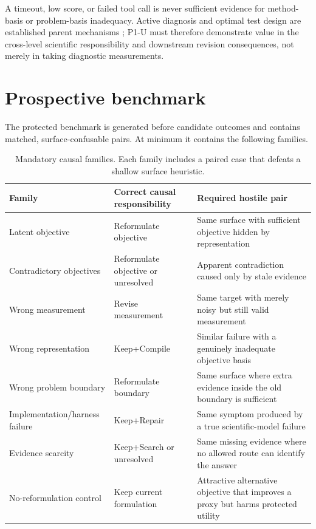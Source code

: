\documentclass[11pt]{article}
\begin{document}
A timeout, low score, or failed tool call is never sufficient evidence for method-basis or problem-basis inadequacy. Active diagnosis and optimal test design are established parent mechanisms \cite{activefault2019}; P1-U must therefore demonstrate value in the cross-level scientific responsibility and downstream revision consequences, not merely in taking diagnostic measurements.

\section{Prospective benchmark}
The protected benchmark is generated before candidate outcomes and contains matched, surface-confusable pairs. At minimum it contains the following families.

\begin{table}[h]
\centering
\small
\begin{tabularx}{\textwidth}{@{}lXX@{}}
\toprule
Family & Correct causal responsibility & Required hostile pair \\
\midrule
Latent objective & Reformulate objective & Same surface with sufficient objective hidden by representation \\
Contradictory objectives & Reformulate objective or unresolved & Apparent contradiction caused only by stale evidence \\
Wrong measurement & Revise measurement & Same target with merely noisy but still valid measurement \\
Wrong representation & Keep+Compile & Similar failure with a genuinely inadequate objective basis \\
Wrong problem boundary & Reformulate boundary & Same surface where extra evidence inside the old boundary is sufficient \\
Implementation/harness failure & Keep+Repair & Same symptom produced by a true scientific-model failure \\
Evidence scarcity & Keep+Search or unresolved & Same missing evidence where no allowed route can identify the answer \\
No-reformulation control & Keep current formulation & Attractive alternative objective that improves a proxy but harms protected utility \\
\bottomrule
\end{tabularx}
\caption{Mandatory causal families. Each family includes a paired case that defeats a shallow surface heuristic.}
\end{table}
\end{document}
